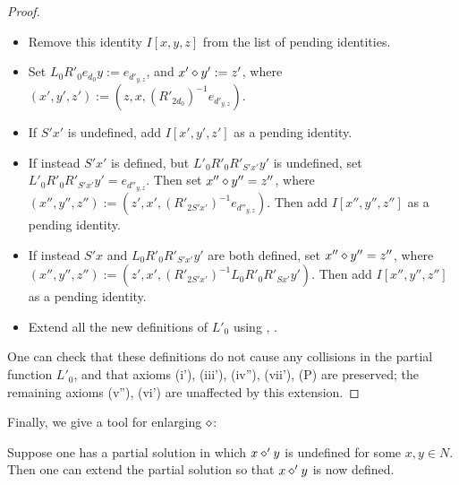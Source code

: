\begin{proof}
\begin{itemize}
\item Remove this identity $I[x,y,z]$ from the list of pending identities.
\item Set $L_0 R'_0 e_{d_0} y := e_{d'_{y,z}}$, and $x' \diamond y' := z'$, where $(x',y',z') := (z, x, (R'_{2d_0})^{-1} e_{d'_{y,z}})$.
\item If $S'x'$ is undefined, add $I[x',y',z']$ as a pending identity.
\item If instead $S'x'$ is defined, but $L'_0 R'_0 R'_{S'x'} y'$ is undefined, set $L'_0 R'_0 R'_{S'x'} y' = e_{d''_{y,z}}$.  Then set $x'' \diamond y'' = z''$, where $(x'',y'',z'') := (z', x', (R'_{2S'x'})^{-1} e_{d''_{y,z}})$.  Then add $I[x'',y'',z'']$ as a pending identity.
\item If instead $S' x$ and $L_0 R'_0 R'_{S'x'} y'$ are both defined, set $x'' \diamond y'' = z''$, where $(x'',y'',z'') := (z', x', (R'_{2S'x'})^{-1} L_0 R'_0 R'_{Sx'} y')$.  Then add $I[x'',y'',z'']$ as a pending identity.
\item Extend all the new definitions of $L'_0$ using , .
\end{itemize}
One can check that these definitions do not cause any collisions in the partial function $L'_0$, and that axioms (i'), (iii'), (iv''), (vii'), (P) are preserved; the remaining axioms (v''), (vi') are unaffected by this extension.
\end{proof}

Finally, we give a tool for enlarging $\op$:

\begin{proposition}[Enlarging $\op$]\label{enlarge-op}\leanok  Suppose one has a partial solution in which $x \diamond' y$ is undefined for some $x,y \in N$.  Then one can extend the partial solution so that $x \diamond' y$ is now defined.
\end{proposition}

